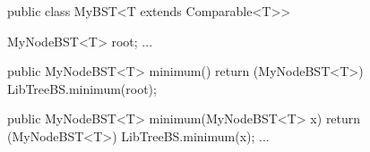 public class MyBST<T extends Comparable<T>> {
	MyNodeBST<T> root;
	...

	public MyNodeBST<T> minimum() {
		return (MyNodeBST<T>) LibTreeBS.minimum(root);
	}

	public MyNodeBST<T> minimum(MyNodeBST<T> x) {
		return (MyNodeBST<T>) LibTreeBS.minimum(x);
	}
	...
}